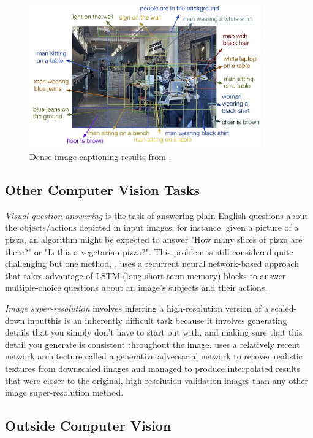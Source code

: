 ﻿\documentclass{article}
\begin{document}
\begin{figure}[h]
\includegraphics[width=10cm]{densecap.png}
\centering
\caption{Dense image captioning results from  \cite{densecap}.}
\end{figure}

\subsection{Other Computer Vision Tasks}

\textit{Visual question answering} is the task of answering plain-English questions about the objects/actions depicted in input images; for instance, given a picture of a pizza, an algorithm might be expected to answer "How many slices of pizza are there?" or "Is this a vegetarian pizza?". This problem is still considered quite challenging but one method, \cite{vqa}, uses a recurrent neural network-based approach that takes advantage of LSTM (long short-term memory) blocks to answer multiple-choice questions about an image's subjects and their actions.

\textit{Image super-resolution} involves inferring a high-resolution version of a scaled-down input\textemdash this is an inherently difficult task because it involves generating details that you simply don't have to start out with, and making sure that this detail you generate is consistent throughout the image. \cite{superres} uses a relatively recent network architecture called a generative adversarial network to recover realistic textures from downscaled images and managed to produce interpolated results that were closer to the original, high-resolution validation images than any other image super-resolution method.

\subsection{Outside Computer Vision}
\end{document}
